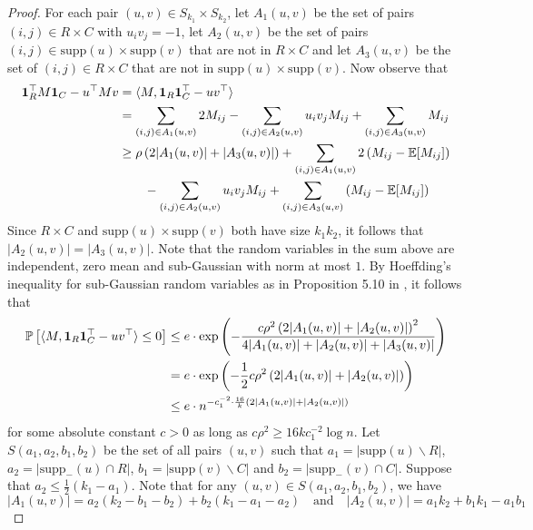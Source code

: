 \begin{proof}
For each pair $(u, v) \in S_{k_1} \times S_{k_2}$, let $A_1(u, v)$ be the set of pairs $(i, j) \in R \times C$ with $u_i v_j = -1$, let $A_2(u, v)$ be the set of pairs $(i, j) \in \text{supp}(u) \times \text{supp}(v)$ that are not in $R \times C$ and let $A_3(u, v)$ be the set of $(i, j) \in R \times C$ that are not in $\text{supp}(u) \times \text{supp}(v)$. Now observe that
\begin{align*}
\mathbf{1}_R^\top M \mathbf{1}_C - u^\top M v &= \langle M, \mathbf{1}_R \mathbf{1}_C^\top - uv^\top \rangle \\
&= \sum_{(i, j) \in A_1(u, v)}  2M_{ij} - \sum_{(i, j) \in A_2(u, v)} u_i v_j M_{ij}+ \sum_{(i, j) \in A_3(u, v)} M_{ij} \\
&\ge \rho \left( 2 |A_1(u, v)| + |A_3(u, v)| \right) + \sum_{(i, j) \in A_1(u, v)}  2\left( M_{ij} - \mathbb{E}[M_{ij}] \right) \\
&\quad \quad - \sum_{(i, j) \in A_2(u, v)} u_i v_j M_{ij} + \sum_{(i, j) \in A_3(u, v)} \left( M_{ij} - \mathbb{E}[M_{ij}] \right)
\end{align*}
Since $R \times C$ and $\text{supp}(u) \times \text{supp}(v)$ both have size $k_1 k_2$, it follows that $|A_2(u, v)| = |A_3(u, v)|$. Note that the random variables in the sum above are independent, zero mean and sub-Gaussian with norm at most $1$. By Hoeffding's inequality for sub-Gaussian random variables as in Proposition 5.10 in \cite{vershynin2010introduction}, it follows that
\begin{align*}
\mathbb{P}\left[ \langle M, \mathbf{1}_R \mathbf{1}_C^\top - uv^\top \rangle \le 0 \right] &\le e \cdot \exp\left( -\frac{c \rho^2 \left( 2 |A_1(u, v)| + |A_2(u, v)| \right)^2}{4 |A_1(u, v)| + |A_2(u, v)| + |A_3(u, v)|} \right) \\
&= e \cdot \exp\left( - \frac{1}{2} c \rho^2 \left( 2|A_1(u, v)| + |A_2(u, v)| \right) \right) \\
&\le e \cdot n^{-c_1^{-2} \cdot \frac{16}{k} \left( 2|A_1(u, v)| + |A_2(u, v)| \right)}
\end{align*}
for some absolute constant $c > 0$ as long as $c\rho^2 \ge 16kc_1^{-2} \log n$. Let $S(a_1, a_2, b_1, b_2)$ be the set of all pairs $(u, v)$ such that $a_1 = |\text{supp}(u) \backslash R|$, $a_2 = |\text{supp}_-(u) \cap R|$, $b_1 = |\text{supp}(v) \backslash C|$ and $b_2 = |\text{supp}_-(v) \cap C|$. Suppose that $a_2 \le \frac{1}{2}(k_1 - a_1)$. Note that for any $(u, v) \in S(a_1, a_2, b_1, b_2)$, we have
$$|A_1(u, v)| = a_2(k_2 - b_1 - b_2) + b_2(k_1 - a_1 - a_2) \quad \text{and} \quad |A_2(u, v)| = a_1 k_2 + b_1 k_1 - a_1 b_1$$

\end{proof}
